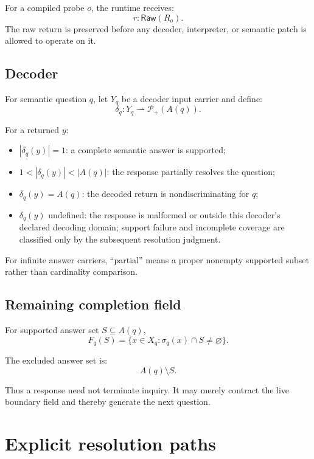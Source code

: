\documentclass[11pt,oneside]{article}
\newcommand{\Raw}{\mathsf{Raw}}
\begin{document}
For a compiled probe \(o\), the runtime receives:
\[
r:\Raw(R_o).
\]
The raw return is preserved before any decoder, interpreter, or semantic patch is allowed to operate on it.

\subsection{Decoder}

For semantic question \(q\), let \(Y_q\) be a decoder input carrier and define:
\[
\boxed{
\delta_q:
Y_q
\rightharpoonup
\mathcal P_+(A(q)).
}
\]

For a returned \(y\):
\begin{itemize}
\item \(|\delta_q(y)|=1\): a complete semantic answer is supported;
\item \(1<|\delta_q(y)|<|A(q)|\): the response partially resolves the question;
\item \(\delta_q(y)=A(q)\): the decoded return is nondiscriminating for \(q\);
\item \(\delta_q(y)\) undefined: the response is malformed or outside this decoder's declared
      decoding domain; support failure and incomplete coverage are classified only by the
      subsequent resolution judgment.
\end{itemize}

For infinite answer carriers, ``partial'' means a proper nonempty supported subset rather than cardinality comparison.

\subsection{Remaining completion field}

For supported answer set \(S\subseteq A(q)\),
\[
\boxed{
F_q(S)
=
\{x\in X_q:\sigma_q(x)\cap S\neq\varnothing\}.
}
\]

The excluded answer set is:
\[
A(q)\setminus S.
\]

Thus a response need not terminate inquiry.  It may merely contract the live boundary field and thereby generate the next question.

\section{Explicit resolution paths}
\end{document}
